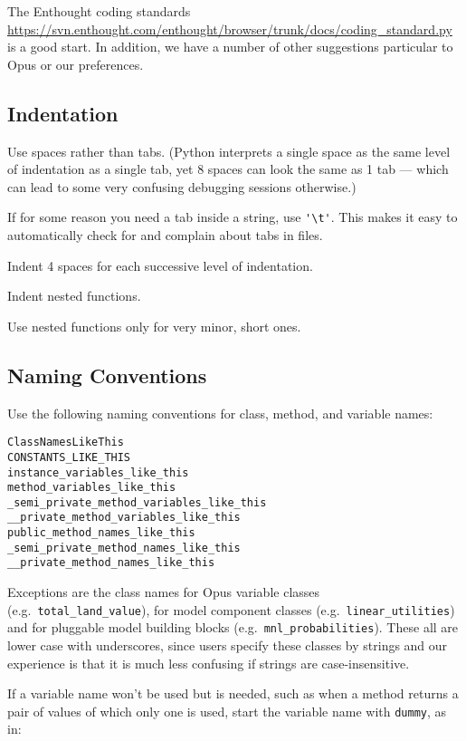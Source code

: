 The Enthought coding standards
\url{https://svn.enthought.com/enthought/browser/trunk/docs/coding_standard.py}
is a good start.  In addition, we have a number of other suggestions particular
to Opus or our preferences.

\subsection{Indentation}

Use spaces rather than tabs.  (Python interprets a single space as the same
level of indentation
as a single tab, yet 8 spaces can look the same as 1 tab --- which can lead
to some very confusing debugging sessions otherwise.)

If for some reason you need a tab inside a
string, use \verb|'\t'|.  This makes it easy to automatically check for and
complain about tabs in files.

Indent 4 spaces for each successive level of indentation.

Indent nested functions.

Use nested functions only for very minor, short ones.

\subsection{Naming Conventions}

Use the following naming conventions for class, method, and variable names:

\begin{verbatim}
ClassNamesLikeThis
CONSTANTS_LIKE_THIS
instance_variables_like_this
method_variables_like_this
_semi_private_method_variables_like_this
__private_method_variables_like_this
public_method_names_like_this
_semi_private_method_names_like_this
__private_method_names_like_this
\end{verbatim}

Exceptions are the class names for Opus variable \variablesindex classes (e.g.\
\mbox{\tt total_land_value}), for model component classes (e.g.\
\mbox{\tt linear_utilities}) and for pluggable model building
blocks (e.g.\ \verb|mnl_probabilities|).  These all are lower case
with underscores, since users specify these classes by strings
and our experience is that it is much less confusing if strings are
case-insensitive.

If a variable name won't be used but is needed, such as when a method returns
a pair of values of which only one is used, start the variable name with 
\verb|dummy|, as in:

